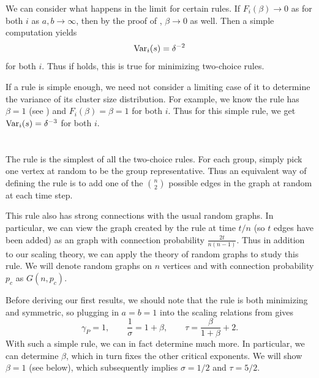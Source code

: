 \documentclass[twoside,10pt]{article}
\begin{document}
We can consider what happens in the limit for certain rules. If $F_{i}(\beta)\to 0$ as for both $i$ as $a,b\to \infty$, then by the proof of , $\beta\to 0$ as well. Then a simple computation yields
\[
	\operatorname{Var}_{i}(s) = \delta^{-2}
\] for both $i$. Thus if  holds, this is true for minimizing two-choice rules.

If a rule is simple enough, we need not consider a limiting case of it to determine the variance of its cluster size distribution. For example, we know the \ER rule has $\beta=1$ (see ) and $F_{i}(\beta) = \beta = 1$ for both $i$. Thus for this simple rule, we get $\operatorname{Var}_{i}(s) = \delta^{-3}$ for both $i$.

\section{\ER}

The \ER rule is the simplest of all the two-choice rules. For each group, simply pick one vertex at random to be the group representative. Thus an equivalent way of defining the \ER rule is to add one of the $\binom{n}{2}$ possible edges in the graph at random at each time step.

This rule also has strong connections with the usual \ER random graphs. In particular, we can view the graph created by the \ER rule at time $t/n$ (so $t$ edges have been added) as an \ER graph with connection probability $\frac{2t}{n(n-1)}$. Thus in addition to our scaling theory, we can apply the theory of \ER random graphs to study this rule. We will denote \ER random graphs on $n$ vertices and with connection probability $p_c$ as $G(n,p_{c})$.

Before deriving our first results, we should note that the \ER rule is both minimizing and symmetric, so plugging in $a=b=1$ into the scaling relations from  gives
\begin{equation}
	\label{ER-crit-exp}
        \gamma_{P} = 1, \qquad \frac{1}{\sigma} = 1 + \beta, \qquad \tau = \frac{\beta}{1+\beta} +2.
\end{equation}
With such a simple rule, we can in fact determine much more. In particular, we can determine $\beta$, which in turn fixes the other critical exponents. We will show $\beta=1$ (see  below), which subsequently implies $\sigma = 1/2$ and $\tau = 5/2$.
\end{document}

